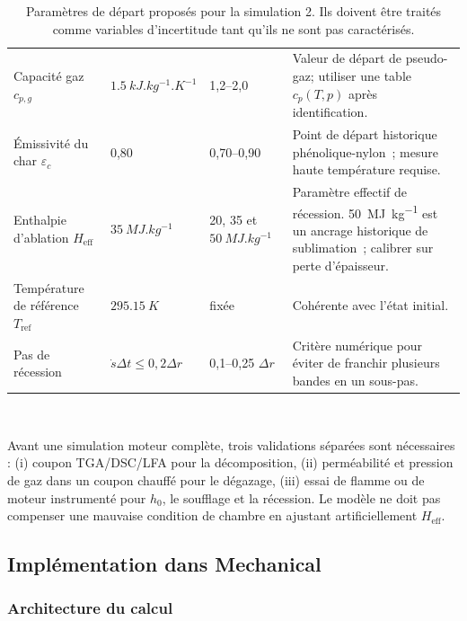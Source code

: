 \documentclass[oneside,openany]{amsdtx}
\begin{document}
\begin{table}[H]
\begin{tabular}{L{0.18\textwidth}M{0.16\textwidth}M{0.18\textwidth}L{0.38\textwidth}}
Capacité gaz \(c_{p,g}\) & \(\SI{1.5}{kJ.kg^{-1}.K^{-1}}\) & 1,2--2,0 & Valeur de départ de pseudo-gaz; utiliser une table \(c_p(T,p)\) après identification. \\
Émissivité du char \(\varepsilon_c\) & 0,80 & 0,70--0,90 & Point de départ historique phénolique-nylon~\cite{clark1972}; mesure haute température requise. \\
Enthalpie d'ablation \(H_\mathrm{eff}\) & \(\SI{35}{MJ.kg^{-1}}\) & 20, 35 et \(\SI{50}{MJ.kg^{-1}}\) & Paramètre effectif de récession. \SI{50}{MJ.kg^{-1}} est un ancrage historique de sublimation~\cite{clark1972}; calibrer sur perte d'épaisseur. \\
Température de référence \(T_\mathrm{ref}\) & \(\SI{295.15}{K}\) & fixée & Cohérente avec l'état initial. \\
Pas de récession & \(\dot s\Delta t\le0{,}2\Delta r\) & 0,1--0,25 \(\Delta r\) & Critère numérique pour éviter de franchir plusieurs bandes en un sous-pas. \\
\bottomrule
\end{tabular}~\\[1em]
\caption{Paramètres de départ proposés pour la simulation 2. Ils doivent être
traités comme variables d'incertitude tant qu'ils ne sont pas caractérisés.}
\label{tab:sim2-values}
\end{table}

Avant une simulation moteur complète, trois validations séparées sont
nécessaires : (i) coupon TGA/DSC/LFA pour la décomposition, (ii) perméabilité et
pression de gaz dans un coupon chauffé pour le dégazage, (iii) essai de flamme ou
de moteur instrumenté pour \(h_0\), le soufflage et la récession. Le modèle ne
doit pas compenser une mauvaise condition de chambre en ajustant artificiellement
\(H_\mathrm{eff}\).

\subsection{Implémentation dans Mechanical}

\subsubsection{Architecture du calcul}
\end{document}
